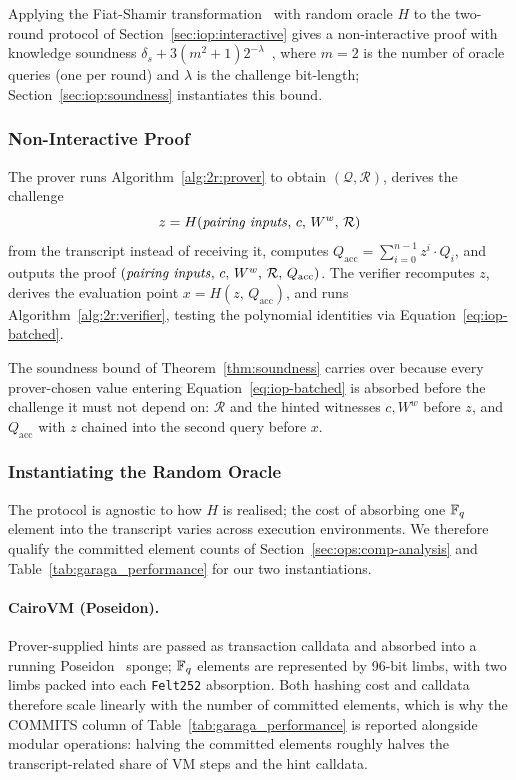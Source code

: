 Applying the Fiat-Shamir transformation~\cite{fiatshamir} with random oracle $H$ to the two-round protocol of Section~\ref{sec:iop:interactive} gives a non-interactive proof with knowledge soundness $\delta_s + 3(m^2+1)2^{-\lambda}$~\cite{IOP-NI}, where $m=2$ is the number of oracle queries (one per round) and $\lambda$ is the challenge bit-length; Section~\ref{sec:iop:soundness} instantiates this bound.

\subsubsection{Non-Interactive Proof} \label{sec:iop:noninteractive}

The prover runs Algorithm~\ref{alg:2r:prover} to obtain $(\mathcal{Q}, \mathcal{R})$, derives the challenge
$$z = H(\text{\textit{pairing inputs}},\, c,\, W^w,\, \mathcal{R})$$
from the transcript instead of receiving it, computes $Q_{\text{acc}} = \sum_{i=0}^{n-1} z^i \cdot Q_i$, and outputs the proof $(\text{\textit{pairing inputs}},\, c,\, W^w,\, \mathcal{R},\, Q_\text{acc})$. The verifier recomputes $z$, derives the evaluation point $x = H(z,\, Q_\text{acc})$, and runs Algorithm~\ref{alg:2r:verifier}, testing the polynomial identities via Equation~\eqref{eq:iop-batched}.

The soundness bound of Theorem~\ref{thm:soundness} carries over because every prover-chosen value entering Equation~\eqref{eq:iop-batched} is absorbed before the challenge it must not depend on: $\mathcal{R}$ and the hinted witnesses $c, W^w$ before $z$, and $Q_\text{acc}$ with $z$ chained into the second query before $x$.

\subsubsection{Instantiating the Random Oracle}\label{sec:iop:fs:ro}

The protocol is agnostic to how $H$ is realised; the cost of absorbing one $\mathbb{F}_q$ element into the transcript varies across execution environments. We therefore qualify the committed element counts of Section~\ref{sec:ops:comp-analysis} and Table~\ref{tab:garaga_performance} for our two instantiations.

\paragraph{CairoVM (Poseidon).} \label{sec:iop:fs:cairo}
Prover-supplied hints are passed as transaction calldata and absorbed into a running Poseidon~\cite{poseidon} sponge; $\mathbb{F}_q$ elements are represented by 96-bit limbs, with two limbs packed into each \texttt{Felt252} absorption. Both hashing cost and calldata therefore scale linearly with the number of committed elements, which is why the COMMITS column of Table~\ref{tab:garaga_performance} is reported alongside modular operations: halving the committed elements roughly halves the transcript-related share of VM steps and the hint calldata.

